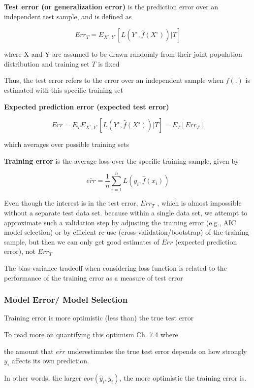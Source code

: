 \documentclass[
]{book}
\begin{document}
\textbf{Test error (or generalization error)} is the prediction error over an independent test sample, and is defined as

\[
Err_T = E_{X^\circ, Y^\circ}[L(Y^\circ, \hat{f}(X^\circ))|T]
\]

where X and Y are assumed to be drawn randomly from their joint population distribution and training set \(T\) is fixed

Thus, the test error refers to the error over an independent sample when \(f(.)\) is estimated with this specific training set

\textbf{Expected prediction error (expected test error)}

\[
Err = E_T E_{X^\circ, Y^\circ}[L(Y^\circ, \hat{f}(X^\circ))|T] = E_T [Err_T]
\]

which averages over possible training sets

\textbf{Training error} is the average loss over the specific training sample, given by

\[
\bar{err} = \frac{1}{n} \sum_{i=1}^n L(y_i, \hat{f}(x_i))
\]

Even though the interest is in the test error, \(Err_T\) , which is almost impossible without a separate test data set. because within a single data set, we attempt to approximate such a validation step by adjusting the training error (e.g., AIC model selection) or by efficient re-use (cross-validation/bootstrap) of the training sample, but then we can only get good estimates of \(Err\) (expected prediction error), not \(Err_T\)

The bias-variance tradeoff when considering loss function is related to the performance of the training error as a measure of test error

\hypertarget{model-error-model-selection}{%
\subsubsection{Model Error/ Model Selection}\label{model-error-model-selection}}

Training error is more optimistic (less than) the true test error

To read more on quantifying this optimism \citep{hastie2001a} Ch. 7.4 where

the amount that \(\bar{err}\) underestimates the true test error depends on how strongly \(y_i\) affects its own prediction.

In other words, the larger \(cov(\hat{y}_i, y_i)\), the more optimistic the training error is.
\end{document}
